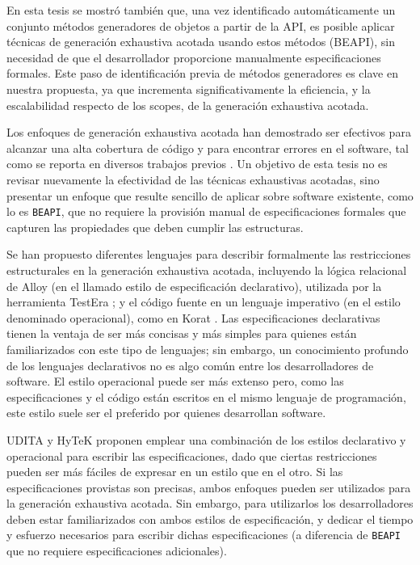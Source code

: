 En esta tesis se mostró también que, una vez identificado automáticamente un
conjunto métodos generadores de objetos a partir de la API, es posible aplicar técnicas de generación 
exhaustiva acotada usando estos métodos (\textsf{BEAPI}), sin necesidad de que el desarrollador
proporcione manualmente especificaciones formales. Este paso de identificación
previa de métodos generadores es clave en nuestra 
propuesta, ya que incrementa significativamente la eficiencia, y la escalabilidad
respecto de los scopes, de la generación exhaustiva acotada. 

Los enfoques de generación exhaustiva acotada han demostrado ser efectivos para
alcanzar una alta cobertura de código y para encontrar errores en el software,
tal como se reporta en diversos trabajos previos
\cite{Marinov01,Khurshid01,Boyapati02,Sullivan04}. Un objetivo de esta tesis no es 
revisar nuevamente la efectividad de las técnicas exhaustivas acotadas, sino
presentar un enfoque que resulte sencillo de aplicar sobre software existente,
como lo es \texttt{BEAPI}, que no requiere 
la provisión manual de especificaciones formales que capturen las propiedades
que deben cumplir las estructuras.

Se han propuesto diferentes lenguajes para describir formalmente las
restricciones estructurales en la generación exhaustiva acotada, incluyendo la lógica relacional de Alloy (en el llamado 
estilo de especificación declarativo), utilizada por la herramienta
\textsf{TestEra} \cite{Marinov01}; y el código fuente en un lenguaje imperativo
(en el estilo denominado operacional), como en 
\textsf{Korat} \cite{Boyapati02}. Las especificaciones declarativas tienen la
ventaja de ser más concisas y más simples para quienes están familiarizados con
este tipo de lenguajes; sin embargo, 
un conocimiento profundo de los lenguajes declarativos no es algo común entre
los desarrolladores de software. El estilo operacional puede ser más extenso
pero, como las especificaciones y el código están escritos en el 
mismo lenguaje de programación, este estilo suele ser el preferido por quienes desarrollan software.

\textsf{UDITA} \cite{Gligoric10} y \textsf{HyTeK} \cite{Rosner14} proponen emplear una combinación de los estilos declarativo y operacional para escribir las 
especificaciones, dado que ciertas restricciones pueden ser más fáciles de expresar 
en un estilo que en el otro. Si las especificaciones provistas son precisas, ambos enfoques
pueden ser utilizados para la generación exhaustiva acotada. Sin embargo, para utilizarlos los desarrolladores deben 
estar familiarizados con ambos estilos de especificación, y dedicar el tiempo y
esfuerzo necesarios para escribir dichas especificaciones (a diferencia de
\texttt{BEAPI} que no requiere especificaciones adicionales).

